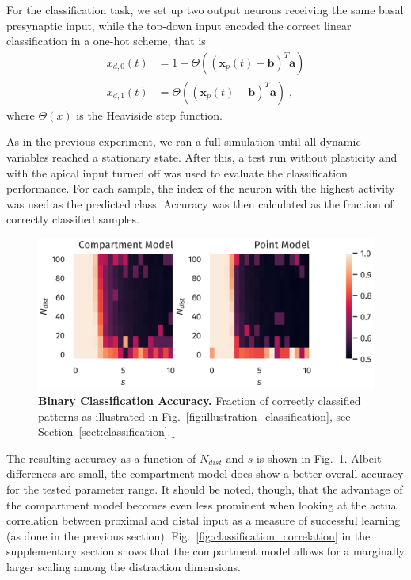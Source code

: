 \documentclass[10pt,a4paper,twocolumn]{article}
\begin{document}
		For the classification task, we set up two output neurons receiving
		the same basal presynaptic input, while the top-down input encoded
		the correct linear classification in a one-hot scheme, that is
		\begin{align}
			x_{d,0}(t) &= 1 - \Theta\left( \left(\mathbf{x}_p(t) - \mathbf{b}\right)^T \mathbf{a}\right) \\
			x_{d,1}(t) &= \Theta\left( \left(\mathbf{x}_p(t) - \mathbf{b}\right)^T \mathbf{a}\right) \; ,
		\end{align}
		where $\Theta(x)$ is the Heaviside step function.
		
		As in the previous experiment, we ran a full simulation until 
		all dynamic variables reached a stationary state. After this,
		a test run without plasticity and with the apical input turned off 
		was used to evaluate the classification	performance. 
		For each sample,
		the index of the neuron with the highest activity was used
		as the predicted class. Accuracy was then calculated as the fraction
		of correctly classified samples.
		\begin{figure}
			\includegraphics[width=\columnwidth]{classification_dimension_scaling_high_input_dim}
			\caption{{\bf Binary Classification Accuracy.}
			Fraction of correctly classified patterns as illustrated in
			Fig.~\ref{fig:illustration_classification}, see 
			Section~\ref{sect:classification}.¸}
		\label{fig:classification_accuracy}
		\end{figure}
		
		The resulting accuracy as a function of $N_{dist}$ and $s$
		is shown in Fig.~\ref{fig:classification_accuracy}.
		Albeit differences are small, the compartment model does
		show a better overall accuracy for the tested parameter range.
		It should be noted, though, that the advantage of the compartment
		model becomes even less prominent when looking at the actual
		correlation between proximal and distal input as a
		measure of successful learning (as done in the previous section).
		Fig.~\ref{fig:classification_correlation} in the supplementary 
		section shows that the compartment model allows for a marginally
		larger scaling among the distraction dimensions.
		
\end{document}
